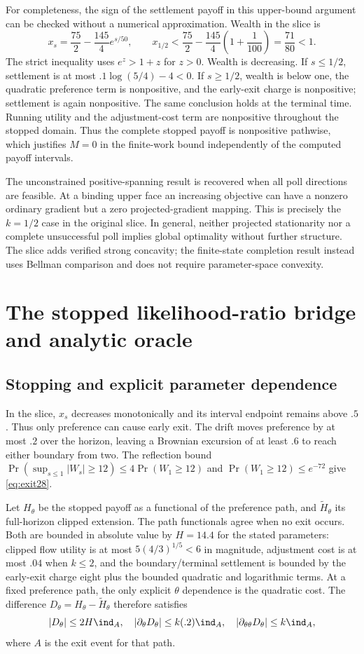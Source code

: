 For completeness, the sign of the settlement payoff in this upper-bound argument can be checked without a numerical approximation. Wealth in the slice is
\[
 x_s=\frac{75}{2}-\frac{145}{4}e^{s/50},\qquad
 x_{1/2}<\frac{75}{2}-\frac{145}{4}\left(1+\frac1{100}\right)=\frac{71}{80}<1.
\]
The strict inequality uses $e^z>1+z$ for $z>0$. Wealth is decreasing. If $s\le1/2$, settlement is at most $.1\log(5/4)-4<0$. If $s\ge1/2$, wealth is below one, the quadratic preference term is nonpositive, and the early-exit charge is nonpositive; settlement is again nonpositive. The same conclusion holds at the terminal time. Running utility and the adjustment-cost term are nonpositive throughout the stopped domain. Thus the complete stopped payoff is nonpositive pathwise, which justifies $M=0$ in the finite-work bound independently of the computed payoff intervals.

The unconstrained positive-spanning result is recovered when all poll directions are feasible. At a binding upper face an increasing objective can have a nonzero ordinary gradient but a zero projected-gradient mapping. This is precisely the $k=1/2$ case in the original slice. In general, neither projected stationarity nor a complete unsuccessful poll implies global optimality without further structure. The slice adds verified strong concavity; the finite-state completion result instead uses Bellman comparison and does not require parameter-space convexity.

\section{The stopped likelihood-ratio bridge and analytic oracle}\label{app:slice28}
\subsection{Stopping and explicit parameter dependence}
In the slice, $x_s$ decreases monotonically and its interval endpoint remains above $.5$. Thus only preference can cause early exit. The drift moves preference by at most $.2$ over the horizon, leaving a Brownian excursion of at least $.6$ to reach either boundary from two. The reflection bound $\Pr(\sup_{s\le1}|W_s|\ge12)\le4\Pr(W_1\ge12)$ and $\Pr(W_1\ge12)\le e^{-72}$ give \eqref{eq:exit28}.

Let $H_\theta$ be the stopped payoff as a functional of the preference path, and $\widetilde H_\theta$ its full-horizon clipped extension. The path functionals agree when no exit occurs. Both are bounded in absolute value by $H=14.4$ for the stated parameters: clipped flow utility is at most $5(4/3)^{1/5}<6$ in magnitude, adjustment cost is at most $.04$ when $k\le2$, and the boundary/terminal settlement is bounded by the early-exit charge eight plus the bounded quadratic and logarithmic terms. At a fixed preference path, the only explicit $\theta$ dependence is the quadratic cost. The difference $D_\theta=H_\theta-\widetilde H_\theta$ therefore satisfies
\begin{equation}
 |D_\theta|\le2H\ind_A,\quad
 |\partial_\theta D_\theta|\le k(.2)\ind_A,\quad
 |\partial_{\theta\theta}D_\theta|\le k\ind_A,
\end{equation}
where $A$ is the exit event for that path.

